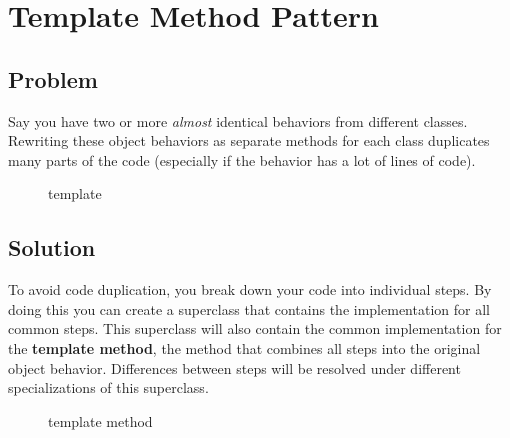 \section{Template Method
Pattern}\label{behavioral-patterns.md__template-method-pattern}

\subsection{Problem}\label{behavioral-patterns.md__problem-4}

Say you have two or more \emph{almost} identical behaviors from
different classes. Rewriting these object behaviors as separate methods
for each class duplicates many parts of the code (especially if the
behavior has a lot of lines of code).

\begin{figure}
\centering
{}
\caption{template}
\end{figure}

\subsection{Solution}\label{behavioral-patterns.md__solution-4}

To avoid code duplication, you break down your code into individual
steps. By doing this you can create a superclass that contains the
implementation for all common steps. This superclass will also contain
the common implementation for the \textbf{template method}, the method
that combines all steps into the original object behavior. Differences
between steps will be resolved under different specializations of this
superclass.

\begin{figure}
\centering
{}
\caption{template method}
\end{figure}

